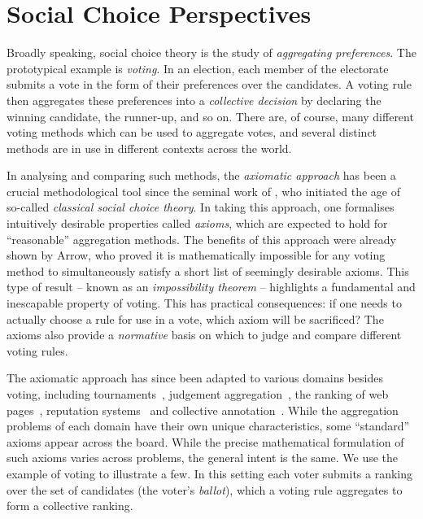 \section{Social Choice Perspectives}
\label{intro_sec_social_choice_perspectives}

Broadly speaking, social choice theory is the study of \emph{aggregating
preferences}. The prototypical example is \emph{voting}. In an election, each
member of the electorate submits a vote in the form of their preferences over
the candidates. A voting rule then aggregates these preferences into a
\emph{collective decision} by declaring the winning candidate, the runner-up,
and so on. There are, of course, many different voting methods which can be
used to aggregate votes, and several distinct methods are in use in different
contexts across the world.

In analysing and comparing such methods, the \emph{axiomatic approach} has been
a crucial methodological tool since the seminal work of \textcite{arrow1952},
who initiated the age of so-called \emph{classical social choice theory}. In
taking this approach, one formalises intuitively desirable properties called
\emph{axioms}, which are expected to hold for ``reasonable'' aggregation
methods. The benefits of this approach were already shown by Arrow, who proved
it is mathematically impossible for any voting method to simultaneously satisfy
a short list of seemingly desirable axioms. This type of result -- known as an
\emph{impossibility theorem} -- highlights a fundamental and inescapable
property of voting.\footnotemark{} This has practical consequences: if one
needs to actually choose a rule for use in a vote, which axiom will be
sacrificed? The axioms also provide a \emph{normative} basis on which to judge
and compare different voting rules.


The axiomatic approach has since been adapted to various domains besides
voting, including tournaments~\cite{brandt2016a}, judgement
aggregation~\cite{endriss2016ja}, the ranking of web
pages~\cite{altman2005ranking}, reputation systems~\cite{tennenholtz2004} and
collective annotation~\cite{kruger2014}. While the aggregation problems of each
domain have their own unique characteristics, some ``standard'' axioms appear
across the board. While the precise mathematical formulation of such axioms
varies across problems, the general intent is the same. We use the example of
voting to illustrate a few. In this setting each voter submits a ranking over
the set of candidates (the voter's \emph{ballot}), which a voting rule
aggregates to form a collective ranking.

